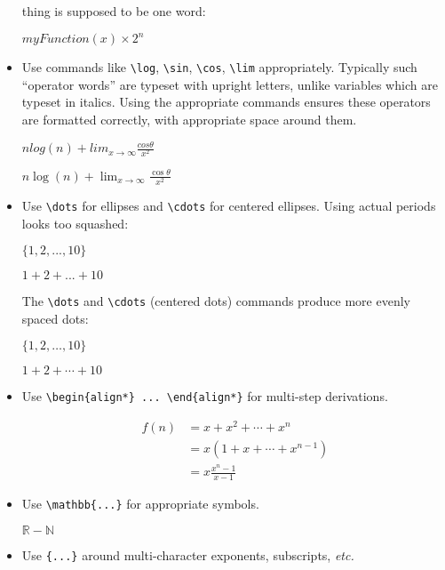 \documentclass{article}
\begin{document}
\begin{itemize}
  thing is supposed to be one word:
  \begin{good}
$\mathit{myFunction}(x) \times 2^n$
  \end{good}
\item Use commands like \verb|\log|, \verb|\sin|, \verb|\cos|,
  \verb|\lim| appropriately.  Typically such ``operator words'' are
  typeset with upright letters, unlike variables which
  are typeset in italics.  Using the appropriate commands ensures
  these operators are formatted correctly, with appropriate space
  around them.
  \begin{bad}
$n log(n) + lim_{x \to \infty} \frac{cos \theta}{x^2}$
  \end{bad}
  \begin{good}
$n \log(n) + \lim_{x \to \infty} \frac{\cos \theta}{x^2}$
  \end{good}
\item Use \verb|\dots| for ellipses and \verb|\cdots| for centered
  ellipses. Using actual periods looks too squashed:
  \begin{bad}
$\{1, 2, ..., 10\}$
  \end{bad}
  \begin{bad}
$1 + 2 + ... + 10$
  \end{bad}
  The \verb|\dots| and \verb|\cdots| (centered dots) commands produce
  more evenly spaced dots:
  \begin{good}
$\{1, 2, \dots, 10\}$
  \end{good}
  \begin{good}
$1 + 2 + \cdots + 10$
  \end{good}
\item Use \verb|\begin{align*} ... \end{align*}| for multi-step
  derivations.
  \begin{good}
\begin{align*}
f(n) &= x + x^2 + \cdots + x^n \\
     &= x(1 + x + \cdots + x^{n-1}) \\
     &= x \frac{x^n - 1}{x - 1}
\end{align*}
  \end{good}
\item Use \verb|\mathbb{...}| for appropriate symbols.
  \begin{good}
$\mathbb{R} - \mathbb{N}$
  \end{good}
\item Use \verb|{...}| around multi-character exponents, subscripts,
  \emph{etc.}

\end{itemize}
\end{document}
